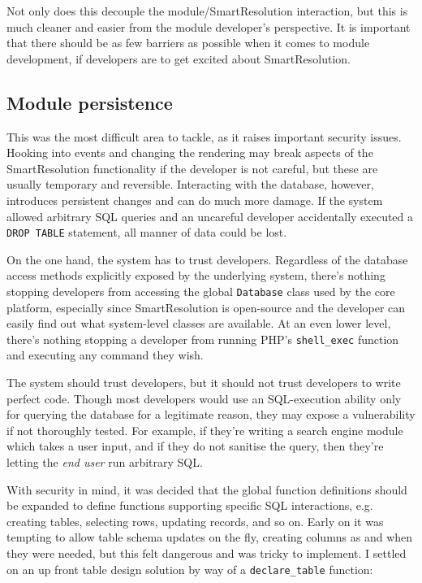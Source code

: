 Not only does this decouple the module/SmartResolution interaction, but this is much cleaner and easier from the module developer's perspective. It is important that there should be as few barriers as possible when it comes to module development, if developers are to get excited about SmartResolution.

\subsection{Module persistence}

This was the most difficult area to tackle, as it raises important security issues. Hooking into events and changing the rendering may break aspects of the SmartResolution functionality if the developer is not careful, but these are usually temporary and reversible. Interacting with the database, however, introduces persistent changes and can do much more damage. If the system allowed arbitrary SQL queries and an uncareful developer accidentally executed a \lstinline{DROP TABLE} statement, all manner of data could be lost.

On the one hand, the system has to trust developers. Regardless of the database access methods explicitly exposed by the underlying system, there's nothing stopping developers from accessing the global \lstinline{Database} class used by the core platform, especially since SmartResolution is open-source and the developer can easily find out what system-level classes are available. At an even lower level, there's nothing stopping a developer from running PHP's \lstinline{shell_exec} function and executing any command they wish.

The system should trust developers, but it should not trust developers to write perfect code. Though most developers would use an SQL-execution ability only for querying the database for a legitimate reason, they may expose a vulnerability if not thoroughly tested. For example, if they're writing a search engine module which takes a user input, and if they do not sanitise the query, then they're letting the \emph{end user} run arbitrary SQL.

With security in mind, it was decided that the global function definitions should be expanded to define functions supporting specific SQL interactions, e.g. creating tables, selecting rows, updating records, and so on. Early on it was tempting to allow table schema updates on the fly, creating columns as and when they were needed, but this felt dangerous and was tricky to implement. I settled on an up front table design solution by way of a \lstinline{declare_table} function:

